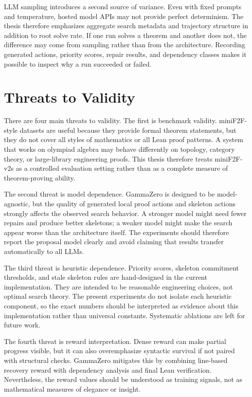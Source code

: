 \documentclass[en]{uet_awesome_thesis/uet-awesome-thesis}
\begin{document}
LLM sampling introduces a second source of variance. Even with fixed prompts and temperature, hosted
model APIs may not provide perfect determinism. The thesis therefore emphasizes aggregate search
metadata and trajectory structure in addition to root solve rate. If one run solves a theorem and another
does not, the difference may come from sampling rather than from the architecture. Recording generated
actions, priority scores, repair results, and dependency classes makes it possible to inspect why a run
succeeded or failed.

\section{Threats to Validity}

There are four main threats to validity. The first is benchmark validity. miniF2F-style datasets are useful
because they provide formal theorem statements, but they do not cover all styles of mathematics or all
Lean proof patterns. A system that works on olympiad algebra may behave differently on topology,
category theory, or large-library engineering proofs. This thesis therefore treats miniF2F-v2s as a
controlled evaluation setting rather than as a complete measure of theorem-proving ability.

The second threat is model dependence. GammaZero is designed to be model-agnostic, but the quality of
generated local proof actions and skeleton actions strongly affects the observed search behavior. A stronger model might
need fewer repairs and produce better skeletons; a weaker model might make the search appear worse
than the architecture itself. The experiments should therefore report the proposal model clearly and avoid
claiming that results transfer automatically to all LLMs.

The third threat is heuristic dependence. Priority scores, skeleton commitment thresholds, and stale
skeleton rules are hand-designed in the current implementation. They are intended to be reasonable
engineering choices, not optimal search theory. The present experiments do not isolate each heuristic
component, so the exact numbers should be interpreted as evidence about this implementation rather than
universal constants. Systematic ablations are left for future work.

The fourth threat is reward interpretation. Dense reward can make partial progress visible, but it can
also overemphasize syntactic survival if not paired with structural checks. GammaZero mitigates this by
combining line-based recovery reward with dependency analysis and final Lean verification. Nevertheless,
the reward values should be understood as training signals, not as mathematical measures of elegance or
insight.
\end{document}
